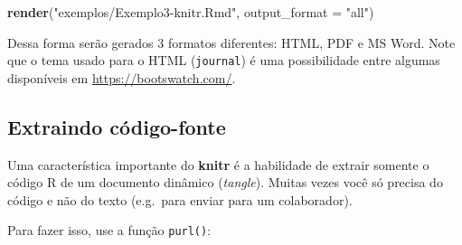 \documentclass[10pt,a4paper]{book}
\newenvironment{Shaded}{\begin{snugshade}}{\end{snugshade}}
\newcommand{\KeywordTok}[1]{\textcolor[rgb]{0.13,0.29,0.53}{\textbf{#1}}}
\newcommand{\DataTypeTok}[1]{\textcolor[rgb]{0.13,0.29,0.53}{#1}}
\newcommand{\StringTok}[1]{\textcolor[rgb]{0.31,0.60,0.02}{#1}}
\newcommand{\NormalTok}[1]{#1}
\begin{document}
\begin{Shaded}
\begin{Highlighting}[]
\KeywordTok{render}\NormalTok{(}\StringTok{"exemplos/Exemplo3-knitr.Rmd"}\NormalTok{, }\DataTypeTok{output_format =} \StringTok{"all"}\NormalTok{)}
\end{Highlighting}
\end{Shaded}

Dessa forma serão gerados 3 formatos diferentes: HTML, PDF e MS Word.
Note que o tema usado para o HTML (\texttt{journal}) é uma possibilidade
entre algumas disponíveis em \url{https://bootswatch.com/}.

\subsection{Extraindo código-fonte}\label{extraindo-codigo-fonte}

Uma característica importante do \textbf{knitr} é a habilidade de
extrair somente o código R de um documento dinâmico (\emph{tangle}).
Muitas vezes você só precisa do código e não do texto (e.g.~para enviar
para um colaborador).

Para fazer isso, use a função \texttt{purl()}:
\end{document}
